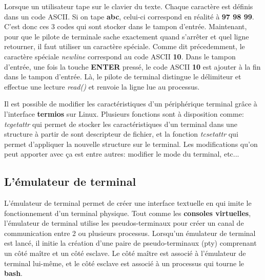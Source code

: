 \begin{tcolorbox}[colback=white,colframe=example,title=Exemple pour le mode canonique]
    Lorsque un utilisateur tape sur le clavier du texte. Chaque caractère est définis dans un code ASCII.
    Si on tape \textbf{abc}, celui-ci correspond en réalité à \textbf{97 98 99}. C'est donc ces 3 codes qui sont stocker dans le tampon d'entrée.
    Maintenant, pour que le pilote de terminale sache exactement quand s'arrêter et quel ligne retourner, il faut utiliser un caractère spéciale.
    Comme dit précedemment, le caractère spéciale \textit{newline} correspond au code ASCII \textbf{10}.
    Dans le tampon d'entrée, une fois la touche \textbf{ENTER} pressé, le code ASCII \textbf{10} est ajouter à la fin dans le tampon d'entrée.
    Là, le pilote de terminal distingue le délimiteur et effectue une lecture \textit{read()} et renvoie la ligne lue au processus.
\end{tcolorbox}

\begin{tcolorbox}[colback=white,colframe=information,title=Information utile]
Il est possible de modifier les caractéristiques d'un périphérique terminal grâce à l'interface \textbf{termios} sur Linux.
Plusieurs fonctions sont à disposition comme: \textit{tcgetattr} qui permet de stocker les caractéristiques d'un terminal dans une structure à partir de sont descripteur de fichier, et la fonction \textit{tcsetattr} qui permet d'appliquer la nouvelle structure sur le terminal.
Les modifications qu'on peut apporter avec ça est entre autres: modifier le mode du terminal, etc...
\end{tcolorbox}

\newpage

\subsection{L'émulateur de terminal}

L'émulateur de terminal permet de créer une interface textuelle en qui imite le fonctionnement d'un terminal physique.
Tout comme les \textbf{consoles virtuelles}, l'émulateur de terminal utilise les pseudos-terminaux pour créer un canal de communication entre 2 ou plusieurs processus. Lorsqu'un émulateur de terminal est lancé, il initie la création d'une paire de pseudo-terminaux (pty) comprenant un côté maître et un côté esclave. Le côté maître est associé à l'émulateur de terminal lui-même, et le côté esclave est associé à un processus qui tourne le \textbf{bash}.

